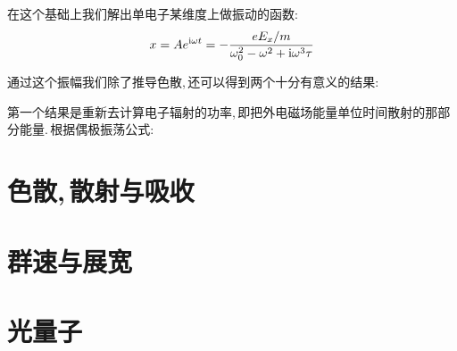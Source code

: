 在这个基础上我们解出单电子某维度上做振动的函数:
\[x=Ae^{{\rm i} \omega t}=-\frac{eE_x/m}{\omega_0^2-\omega^2+{\rm i} \omega^3\tau}\]

通过这个振幅我们除了推导色散,\,还可以得到两个十分有意义的结果:

第一个结果是重新去计算电子辐射的功率,\,即把外电磁场能量单位时间散射的那部分能量.\,根据偶极振荡公式:





\section{色散,\,散射与吸收}

\section{群速与展宽}

\section{光量子}


